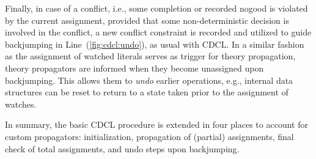Finally, in case of a conflict, i.e., some completion or recorded nogood is violated by
the current assignment,
provided that some non-deterministic decision is involved in the conflict,
a new conflict constraint is recorded and utilized to guide backjumping
in Line~(\ref{fig:cdcl:undo}), as usual with CDCL.
In a similar fashion as the assignment of watched literals serves as
trigger for theory propagation, theory propagators are informed when they become
unassigned upon backjumping.
This allows them to \emph{undo} earlier operations, e.g., internal data structures can be
reset to return   to a state taken prior to the assignment of watches.

In summary, the basic CDCL procedure is extended in four places to account for
custom propagators: initialization, propagation of (partial) assignments,
final check of total assignments, and undo steps upon backjumping.


